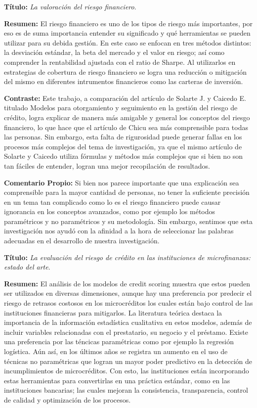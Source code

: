 \documentclass[
  letterpaper,
  DIV=11,
  numbers=noendperiod]{scrreprt}
\begin{document}
\textbf{Título:} \emph{La valoración del riesgo financiero}.

\textbf{Resumen:} El riesgo financiero es uno de los tipos de riesgo más
importantes, por eso es de suma importancia entender su significado y
qué herramientas se pueden utilizar para su debida gestión. En este caso
se enfocan en tres métodos distintos: la desviación estándar, la beta
del mercado y el valor en riesgo; así como comprender la rentabilidad
ajustada con el ratio de Sharpe. Al utilizarlos en estrategias de
cobertura de riesgo financiero se logra una reducción o mitigación del
mismo en diferentes intrumentos financieros como las carteras de
inversión.

\textbf{Contraste:} Este trabajo, a comparación del artículo de Solarte
J. y Caicedo E. titulado Modelos para otorgamiento y seguimiento en la
gestión del riesgo de crédito, logra explicar de manera más amigable y
general los conceptos del riesgo financiero, lo que hace que el artículo
de Chicu sea más comprensible para todas las personas. Sin embargo, esta
falta de rigurosidad puede generar fallas en los procesos más complejos
del tema de investigación, ya que el mismo artículo de Solarte y Caicedo
utiliza fórmulas y métodos más complejos que si bien no son tan fáciles
de entender, logran una mejor recopilación de resultados.

\textbf{Comentario Propio:} Si bien nos parece importante que una
explicación sea comprensible para la mayor cantidad de personas, no
tener la suficiente precisión en un tema tan complicado como lo es el
riesgo financiero puede causar ignorancia en los conceptos avanzados,
como por ejemplo los métodos paramétricos y no paramétricos y su
metodología. Sin embargo, sentimos que esta investigación nos ayudó con
la afinidad a la hora de seleccionar las palabras adecuadas en el
desarrollo de nuestra investigación.

\textbf{Título:} \emph{La evaluación del riesgo de crédito en las
instituciones de microfinanzas: estado del arte}.

\textbf{Resumen:} El análisis de los modelos de credit scoring muestra
que estos pueden ser utilizados en diversas dimensiones, aunque hay una
preferencia por predecir el riesgo de retrasos costosos en los
microcréditos los cuales están bajo control de las instituciones
financieras para mitigarlos. La literatura teórica destaca la
importancia de la información estadística cualitativa en estos modelos,
además de incluir variables relacionadas con el prestatario, su negocio
y el préstamo. Existe una preferencia por las téncicas paramétricas como
por ejemplo la regresión logística. Aún así, en los últimos años se
registra un aumento en el uso de técnicas no paramétricas que logran un
mayor poder predictivo en la detección de incumplimientos de
microcréditos. Con esto, las instituciones están incorporando estas
herramientas para convertirlas en una práctica estándar, como en las
instituciones bancarias; las cuales mejoran la consistencia,
transparencia, control de calidad y optimización de los procesos.
\end{document}
